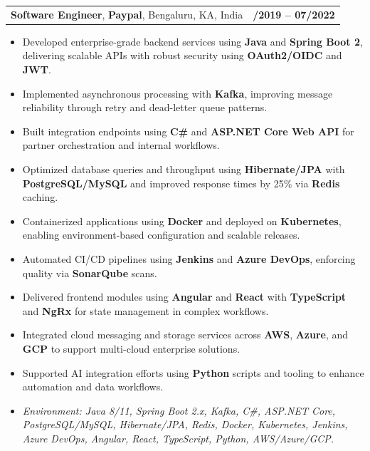 \documentclass[letterpaper,11pt]{article}
\makeatletter
\newcommand{\resumeItem}[1]{
  \item\footnotesize{
    {#1 \vspace{-2pt}}
  }
}
\newcommand{\resumeSubheading}[4]{
  \vspace{-2pt}\item
    \begin{tabular*}{1.0\textwidth}[t]{l@{\extracolsep{\fill}}r}
      \textbf{\fontsize{10pt}{14pt}\selectfont #3}, \textbf{\fontsize{10pt}{14pt}\selectfont #1}, \fontsize{10pt}{14pt}\selectfont #4 & \textbf{\fontsize{10pt}{14pt}\selectfont #2} \\
    \end{tabular*}\vspace{-7pt}
}
\newcommand{\resumeItemListStart}{\begin{itemize}[leftmargin=*]}
\newcommand{\resumeItemListEnd}{\end{itemize}\vspace{-5pt}}
\makeatother
\begin{document}
\resumeSubheading
{Paypal}{08/2019 -- 07/2022}
{Software Engineer}{Bengaluru, KA, India}
\resumeItemListStart
  \resumeItem{Developed enterprise-grade backend services using \textbf{Java} and \textbf{Spring Boot 2}, delivering scalable APIs with robust security using \textbf{OAuth2/OIDC} and \textbf{JWT}.}
  \resumeItem{Implemented asynchronous processing with \textbf{Kafka}, improving message reliability through retry and dead-letter queue patterns.}
  \resumeItem{Built integration endpoints using \textbf{C\#} and \textbf{ASP.NET Core Web API} for partner orchestration and internal workflows.}
  \resumeItem{Optimized database queries and throughput using \textbf{Hibernate/JPA} with \textbf{PostgreSQL/MySQL} and improved response times by 25\% via \textbf{Redis} caching.}
  \resumeItem{Containerized applications using \textbf{Docker} and deployed on \textbf{Kubernetes}, enabling environment-based configuration and scalable releases.}
  \resumeItem{Automated CI/CD pipelines using \textbf{Jenkins} and \textbf{Azure DevOps}, enforcing quality via \textbf{SonarQube} scans.}
  \resumeItem{Delivered frontend modules using \textbf{Angular} and \textbf{React} with \textbf{TypeScript} and \textbf{NgRx} for state management in complex workflows.}
  \resumeItem{Integrated cloud messaging and storage services across \textbf{AWS}, \textbf{Azure}, and \textbf{GCP} to support multi-cloud enterprise solutions.}
  \resumeItem{Supported AI integration efforts using \textbf{Python} scripts and tooling to enhance automation and data workflows.}
  \resumeItem{\textit{Environment: Java 8/11, Spring Boot 2.x, Kafka, C\#, ASP.NET Core, PostgreSQL/MySQL, Hibernate/JPA, Redis, Docker, Kubernetes, Jenkins, Azure DevOps, Angular, React, TypeScript, Python, AWS/Azure/GCP.}}
\resumeItemListEnd
\end{document}
